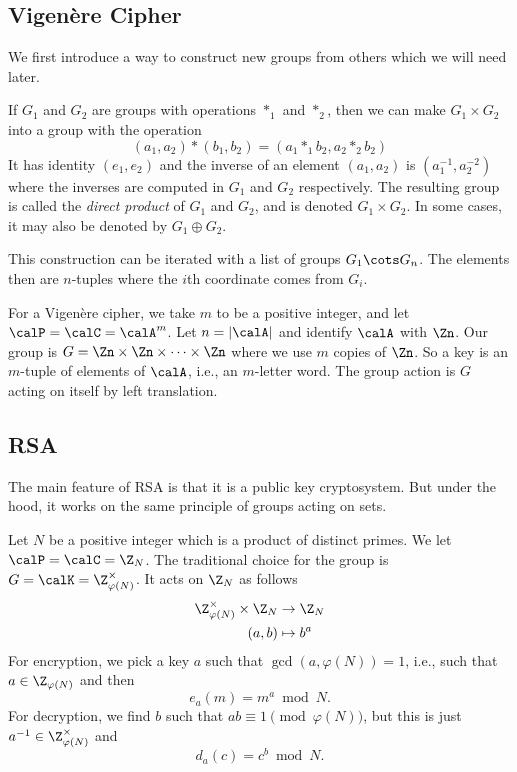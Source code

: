 \documentclass[12pt]{amsart}
\theoremstyle{plain}
\theoremstyle{definition}
\theoremstyle{remark}
\begin{document}
\subsection{Vigen\`ere Cipher}
\label{vigenere}
We first introduce a way to construct new groups from others which
we will need later.

If $G_1$ and $G_2$ are groups with operations $*_1$ and $*_2$, then
we can make $G_1\times G_2$ into a group with the operation
\[ (a_1,a_2)*(b_1,b_2) = (a_1*_1 b_2, a_2*_2 b_2) \]
It has identity $(e_1, e_2)$ and the inverse of an element $(a_1,a_2)$
is $(a_1^{-1}, a_2^{-2})$ where the inverses are computed in $G_1$
and $G_2$ respectively.  The resulting group is called the {\em
direct product} of $G_1$ and $G_2$, and is denoted $G_1\times G_2$.
In some cases, it may also be denoted by $G_1\oplus G_2$.

This construction can be iterated with a list of groups
$G_1\cots G_n$.  The elements then are $n$-tuples where the $i$th
coordinate comes from $G_i$.

For a Vigen\`ere cipher, we take $m$ to be a positive integer, and let
$\calP=\calC=\calA^m$.  Let $n=|\calA|$ and identify $\calA$ with
$\Zn$.  Our group is $G=\Zn\times\Zn\times\cdots \times \Zn$ where we
use $m$ copies of $\Zn$.  So a key is an $m$-tuple of elements of
$\calA$, i.e., an $m$-letter word.  The group action is $G$ acting on
itself by left translation.

\subsection{RSA}
The main feature of RSA is that it is a public key cryptosystem.  But
under the hood, it works on the same principle of groups acting on
sets.

Let $N$ be a positive integer which is a product of distinct primes.
We let $\calP=\calC=\Z_N$.  The traditional choice for the group is
$G=\calK=\Z_{\varphi(N)}^\times$.  It acts on $\Z_N$ as follows
\begin{align*}
\Z_{\varphi(N)}^\times\times\Z_N &\to \Z_N   \\
(a, b) &\mapsto b^a
\end{align*}
For encryption, we pick a key $a$ such that $\gcd(a, \varphi(N))=1$,
i.e., such that $a\in\Z_{\varphi(N)}$ and then
\[ e_a(m) = m^a \bmod N.\]
For decryption, we find $b$ such that $ab\equiv 1\pmod{\varphi(N)}$,
but this is just $a^{-1}\in\Z_{\varphi(N)}^\times$ and
\[ d_a(c) = c^b\bmod N.\]
\end{document}
